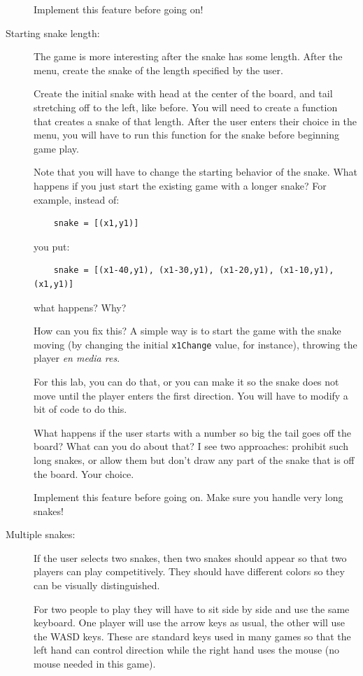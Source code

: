 \documentclass[12pt]{article}
\begin{document}
\begin{description}
Implement this feature before going on!

\item[Starting snake length:] 
The game is more interesting after the snake
has some length.  After the menu, create the snake
of the length specified by the user.

Create the initial snake with head
at the center of the board, and tail stretching off to
the left, like before.  You will need to create a function that
creates a snake of that length.  After the user
enters their choice in the menu, you will have to
run this function for the snake before beginning 
game play.

Note that you will have to change the starting
behavior of the snake.  What happens if you 
just start the existing game with a longer snake?  For example,
instead of:
\begin{lstlisting}
    snake = [(x1,y1)]
\end{lstlisting}
you put:
\begin{lstlisting}
    snake = [(x1-40,y1), (x1-30,y1), (x1-20,y1), (x1-10,y1), (x1,y1)]
\end{lstlisting}
what happens?  Why?

How can you fix this?  A simple way is to start the game with the snake
moving (by changing the initial
\lstinline{x1Change} value, for instance), 
throwing the player {\em en media res}.  

For this lab, you can do that, or
you can make it so the snake does not move until
the player enters the first direction.  
You will have to modify a bit of code to do this.

What happens if the user starts with a number
so big the tail goes off the board?  What can you do
about that?  I see two approaches:  prohibit such long
snakes, or allow them but don't draw any part of the snake
that is off the board.  Your choice.

Implement this feature before going on.  Make sure you handle
very long snakes!

\item[Multiple snakes:]  If the user selects two snakes,
then two snakes should appear so that two players
can play competitively.  They should have different
colors so they can be visually distinguished.

For two people to play they will have to sit side
by side and use the same keyboard.  One player will
use the arrow keys as usual, the other will use the WASD
keys.  These are standard keys used in many games so that
the left hand can control direction while the right
hand uses the mouse (no mouse needed in this game).


\end{description}
\end{document}

